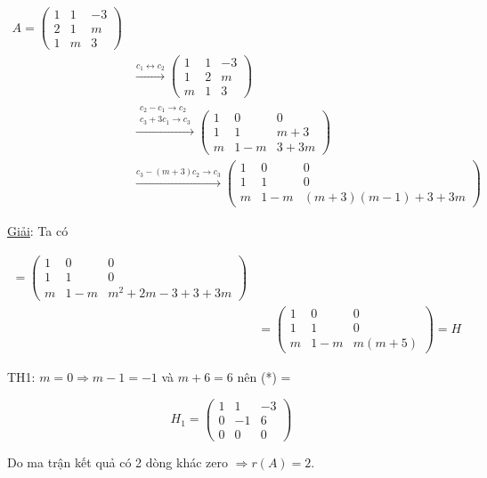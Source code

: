 \documentclass[12pt,a4paper]{article} \usepackage[utf8]{inputenc} \usepackage[T5]{fontenc} \usepackage[vietnamese]{babel} \usepackage{amsmath, amssymb, amsfonts} \usepackage{ulem}
\begin{document}
\begin{align*}
A = \begin{pmatrix} 1 & 1 & -3 \\ 2 & 1 & m \\ 1 & m & 3 \end{pmatrix}  \\
&\xrightarrow{c_1 \leftrightarrow c_2} \begin{pmatrix} 1 & 1 & -3 \\ 1 & 2 & m \\ m & 1 & 3 \end{pmatrix} \\
&\xrightarrow{\substack{c_2 - c_1 \to c_2 \\ c_3 + 3c_1 \to c_3} } \begin{pmatrix} 1 & 0 & 0 \\ 1 & 1 & m+3 \\ m & 1-m & 3+3m \end{pmatrix} \\
&\xrightarrow{c_3 - (m+3)c_2 \to c_3} \begin{pmatrix} 1 & 0 & 0 \\ 1 & 1 & 0 \\ m & 1-m & (m+3)(m-1) + 3+3m \end{pmatrix}
\end{align*}

\ul{Giải}: Ta có

\begin{align*}
= \begin{pmatrix} 1 & 0 & 0 \\ 1 & 1 & 0 \\ m & 1-m & m^2+2m-3+3+3m \end{pmatrix} \\
&= \begin{pmatrix}1 & 0 & 0 \\ 1 & 1 & 0 \\ m & 1-m & m(m+5) \end{pmatrix} = H
\end{align*}

TH1: $m = 0 \Rightarrow m - 1 = -1$ và $m + 6 = 6$ nên (*) =

$$
H_1 = \begin{pmatrix} 1 & 1 & -3 \\ 0 & -1 & 6 \\ 0 & 0 & 0 \end{pmatrix}
$$

Do ma trận kết quả có 2 dòng khác zero $\Rightarrow r(A) = 2$.
\end{document}
